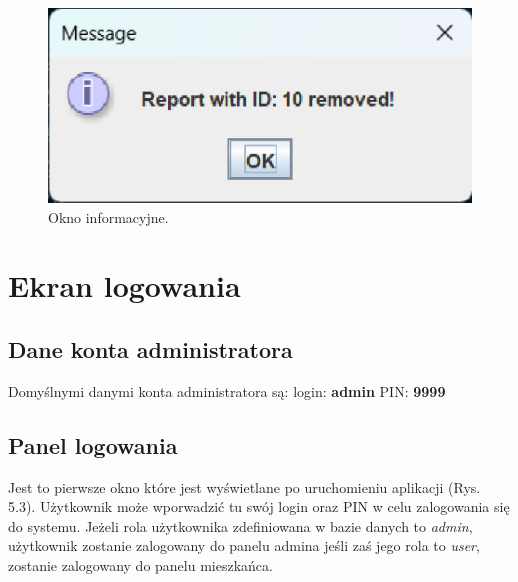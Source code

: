 \begin{figure}[H]
    \centering
    \includegraphics[width=\textwidth,height=0.2\textheight,keepaspectratio]{figures/app-images/info.eps}
    \caption{Okno informacyjne. \label{fig7}}
\end{figure}

\newpage
\section{Ekran logowania}
\subsection{Dane konta administratora}
\noindent Domyślnymi danymi konta administratora są: 
\newline login: \textbf{admin}
\newline PIN: \textbf{9999}

\subsection{Panel logowania}
Jest to pierwsze okno które jest wyświetlane po uruchomieniu aplikacji (Rys. 5.3). Użytkownik może wporwadzić tu swój login oraz PIN w celu
zalogowania się do systemu. Jeżeli rola użytkownika zdefiniowana w bazie danych to \textit{admin}, użytkownik 
zostanie zalogowany do panelu admina jeśli zaś jego rola to \textit{user}, zostanie zalogowany do panelu mieszkańca.

